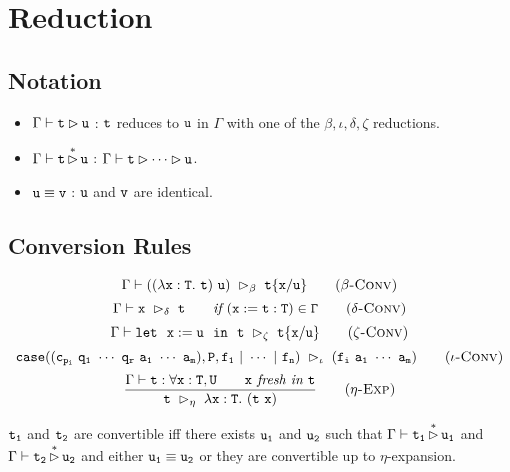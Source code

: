 \section{Reduction}

\subsection{Notation}
\begin{itemize}
    \item $\Gamma\vdash \tt t\rhd u$ : $\tt t$ reduces to $\tt u$ in $\Gamma$ with 
    one of the $\beta,\iota,\delta,\zeta$ reductions.
    \item $\Gamma\vdash \tt t\mathop{\rhd}\limits^* u$ : $\Gamma\vdash\tt t\rhd\cdots\rhd u$.
    \item $\tt u\equiv v$ : $\tt u$ and $\tt v$ are identical.
\end{itemize}

\subsection{Conversion Rules}
\begin{equation*}
    \Gamma\vdash\tt((\lambda x:T.\ t)\ u)\ \rhd_\beta\ t\{x/u\}
    \tag{\sc $\beta$-Conv}
\end{equation*}
\begin{equation*}
    \Gamma\vdash\tt x\ \rhd_\delta\ t\qquad \textit{if }(x:=t:T)\in\Gamma
    \tag{\sc $\delta$-Conv}
\end{equation*}
\begin{equation*}
\Gamma\vdash \tt let\ \ x:=u\ \ in\ \ t\ \rhd_\zeta\ t\{x/u\}
    \tag{\sc $\zeta$-Conv}
\end{equation*}
\begin{equation*}
    \tt case((c_{p_i}\ q_1\ \cdots\ q_r\ a_1\ \cdots\ a_m),P,f_1\ |\ \cdots\ |\ f_n)\ \rhd_\iota\ (f_i\ a_1\ \cdots\ a_m)
    \tag{\sc $\iota$-Conv}
\end{equation*}
\begin{equation*}
\frac{\Gamma\vdash \tt t:\forall x:T,U\qquad x\textit{ fresh in }t}
    {\tt t\ \rhd_\eta\ \lambda\tt x:T.\ (t\ x)}
    \tag{\sc $\eta$-Exp}
\end{equation*}

\begin{Def}[Convertibility]
$\tt t_1$ and $\tt t_2$ are convertible iff there exists $\tt u_1$ and $\tt u_2$ such that 
$\Gamma\vdash \tt t_1\mathop{\rhd}\limits^* u_1$ and $\Gamma\vdash \tt t_2\mathop{\rhd}\limits^* u_2$ 
and either $\tt u_1\equiv u_2$ or they are convertible up to $\eta$-expansion.
\end{Def}

